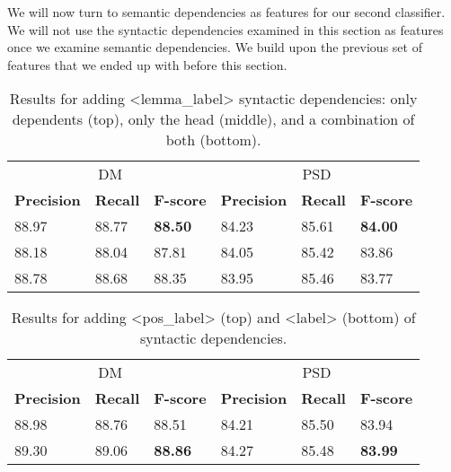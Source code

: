 We will now turn to semantic dependencies as features for our second classifier. We will not use the syntactic dependencies examined in this section as features once we examine semantic dependencies. We build upon the previous set of features that we ended up with before this section.


\begin{table}
    \centering
    \smaller[0.2]
    \begin{tabular}{@{}llllll@{}}
        \toprule
        \multicolumn{3}{c}{DM}
        & \multicolumn{3}{c}{PSD} \\
        \textbf{Precision} & \textbf{Recall} & \textbf{F-score} & \textbf{Precision} & \textbf{Recall} & \textbf{F-score} \\
        \midrule
        88.97 & 88.77 & \textbf{88.50} & 84.23 & 85.61 & \textbf{84.00} \\
        88.18 & 88.04 & 87.81 & 84.05 & 85.42 & 83.86 \\
        88.78 & 88.68 & 88.35 & 83.95 & 85.46 & 83.77 \\
        \bottomrule
    \end{tabular}
    \caption{Results for adding <lemma\_label> syntactic dependencies: only dependents (top), only the head (middle), and a combination of both (bottom).}
    \label{table:dependents_head}
\end{table}

\begin{table}
    \centering
    \smaller[0.2]
    \begin{tabular}{@{}llllll@{}}
        \toprule
        \multicolumn{3}{c}{DM}
        & \multicolumn{3}{c}{PSD} \\
        \textbf{Precision} & \textbf{Recall} & \textbf{F-score} & \textbf{Precision} & \textbf{Recall} & \textbf{F-score} \\
        88.98 & 88.76 & 88.51 & 84.21 & 85.50 & 83.94 \\
        89.30 & 89.06 & \textbf{88.86} & 84.27 & 85.48 & \textbf{83.99} \\
        \bottomrule
    \end{tabular}
    \caption{Results for adding <pos\_label> (top) and <label> (bottom) of syntactic dependencies.}
    \label{table:dependents_label}
\end{table}


